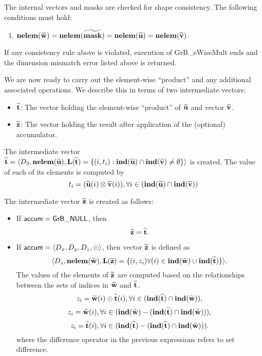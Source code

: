 The internal vectors and masks are checked for shape consistency. The following 
conditions must hold:
\begin{enumerate}
	\item $\bold{nelem}({\bf \widetilde{w}}) = \bold{nelem}({\bf \widetilde{mask}})
    = \bold{nelem}({\bf \widetilde{u}}) = \bold{nelem}({\bf \widetilde{v}})$.
\end{enumerate}
If any consistency rule above is violated, execution of {\sf GrB\_eWiseMult} ends and 
the dimension mismatch error listed above is returned.

We are now ready to carry out the element-wise ``product'' and any additional 
associated operations.  We describe this in terms of two intermediate vectors:
\begin{itemize}
	\item ${\bf \widetilde{t}}$: The vector holding the element-wise ``product'' of
    ${\bf \widetilde{u}}$ and vector ${\bf \widetilde{v}}$.
	\item ${\bf \widetilde{z}}$: The vector holding the result after 
    application of the (optional) accumulator.
\end{itemize}

The intermediate vector ${\bf \widetilde{t}} = \langle
D_3, \bold{nelem}({\bf \widetilde{u}}),
\bold{L}({\bf \widetilde{t}}) =
\{(i,t_i) : \bold{ind}({\bf \widetilde{u}}) \cap 
\bold{ind}({\bf \widetilde{v}})
 \neq \emptyset \} \rangle$
is created.  The value of each of its elements is computed by 
\[t_i = ({\bf \widetilde{u}}(i)
\otimes {\bf \widetilde{v}}(i)), \forall i \in 
(\bold{ind}({\bf \widetilde{u}}) \cap 
\bold{ind}({\bf \widetilde{v}}))\]

The intermediate vector ${\bf \widetilde{z}}$ is created as follows:
\begin{itemize}
    \item If ${\sf accum} = {\sf GrB\_NULL}$, then \[ {\bf \widetilde{z}} = {\bf \widetilde{t}}.\]

    \item If ${\sf accum} = \langle D_x, D_y, D_z, \odot \rangle$, then vector ${\bf \widetilde{z}}$ is defined as 
        \[ \langle D_z, \bold{nelem}({\bf \widetilde{w}}), \bold{L}({\bf \widetilde{z}})
		= \{(i,z_{i})  \forall (i) \in \bold{ind}({\bf \widetilde{w}}) \cup 
        \bold{ind}({\bf \widetilde{t}}) \} \rangle.\]
    The values of the elements of ${\bf \widetilde{z}}$ are computed based on the relationships between the sets of indices in ${\bf \widetilde{w}}$ and ${\bf \widetilde{t}}$.
\[
z_{i} = {\bf \widetilde{w}}(i) \odot {\bf \widetilde{t}}(i), \forall i \in  (\bold{ind}({\bf \widetilde{t}}) \cap \bold{ind}({\bf \widetilde{w}})),
\]
\[
z_{i} = {\bf \widetilde{w}}(i), \forall  i \in  (\bold{ind}({\bf \widetilde{w}}) - (\bold{ind}({\bf \widetilde{t}}) \cap \bold{ind}({\bf \widetilde{w}}))),
\]
\[
z_{i} = {\bf \widetilde{t}}(i), \forall  i \in  (\bold{ind}({\bf \widetilde{t}}) - (\bold{ind}({\bf \widetilde{t}}) \cap \bold{ind}({\bf \widetilde{w}}))).
\]
where the difference operator in the previous expressions refers to set difference.
\end{itemize}


